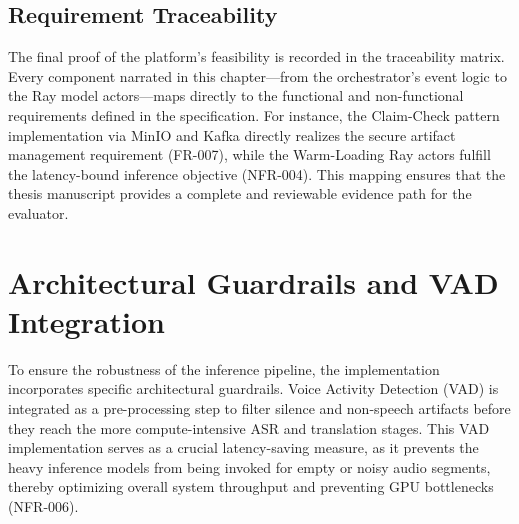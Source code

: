 \subsection{Requirement Traceability}
The final proof of the platform's feasibility is recorded in the traceability matrix. Every component narrated in this chapter—from the orchestrator's event logic to the Ray model actors—maps directly to the functional and non-functional requirements defined in the specification. For instance, the Claim-Check pattern implementation via MinIO and Kafka directly realizes the secure artifact management requirement (FR-007), while the Warm-Loading Ray actors fulfill the latency-bound inference objective (NFR-004). This mapping ensures that the thesis manuscript provides a complete and reviewable evidence path for the evaluator.

\section{Architectural Guardrails and VAD Integration}
\label{sec:impl_guardrails}

To ensure the robustness of the inference pipeline, the implementation incorporates specific architectural guardrails. Voice Activity Detection (VAD) is integrated as a pre-processing step to filter silence and non-speech artifacts before they reach the more compute-intensive ASR and translation stages. This VAD implementation serves as a crucial latency-saving measure, as it prevents the heavy inference models from being invoked for empty or noisy audio segments, thereby optimizing overall system throughput and preventing GPU bottlenecks (NFR-006).
